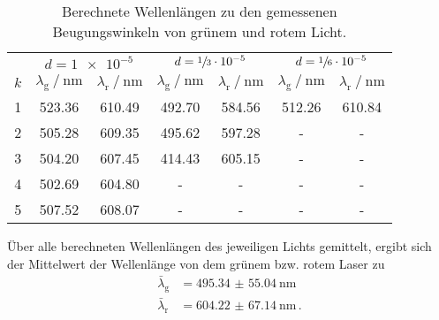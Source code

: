 \begin{table}
    \centering
    \caption{Berechnete Wellenlängen zu den gemessenen Beugungswinkeln von grünem und rotem Licht.}
    \label{tab:diffractionwavelength}
    \begin{tabular} {S[table-format=1.0] 
                     S[table-format=3.2]  S[table-format=3.2]
                     S[table-format=3.2]  S[table-format=3.2] 
                     S[table-format=3.2]  S[table-format=3.2]}
        \toprule
        & 
         & 
         & 
        \\
        \cmidrule(lr){2-3}\cmidrule(lr){4-5}\cmidrule(lr){6-7}
        {$k$} 
        & {$\lambda_\text{g} \mathbin{/} \si{\nano\metre}$} & {$\lambda_\text{r} \mathbin{/} \si{\nano\metre}$}
        & {$\lambda_\text{g} \mathbin{/} \si{\nano\metre}$} & {$\lambda_\text{r} \mathbin{/} \si{\nano\metre}$}
        & {$\lambda_\text{g} \mathbin{/} \si{\nano\metre}$} & {$\lambda_\text{r} \mathbin{/} \si{\nano\metre}$} \\
     & 523.36 & 610.49 & 492.70 & 584.56 & 512.26 & 610.84\\
    2 & 505.28 & 609.35 & 495.62 & 597.28 & {-}    & {-}   \\
    3 & 504.20 & 607.45 & 414.43 & 605.15 & {-}    & {-}   \\
    4 & 502.69 & 604.80 & {-}    & {-}    & {-}    & {-}   \\
    5 & 507.52 & 608.07 & {-}    & {-}    & {-}    & {-}   \\
    \bottomrule
\end{tabular}
\end{table}
Über alle berechneten Wellenlängen des jeweiligen Lichts  gemittelt, ergibt sich der Mittelwert der Wellenlänge von dem grünem bzw. rotem Laser zu
\begin{align*}
    \bar{\lambda}_\text{g} & = \SI{495.34(5504)}{\nano\metre} \\
    \bar{\lambda}_\text{r} & = \SI{604.22(6714)}{\nano\metre} \, \text{.}
\end{align*}